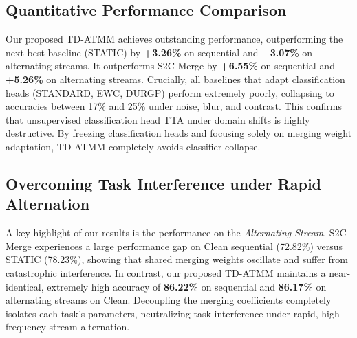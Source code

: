 \documentclass{article}
\theoremstyle{plain}
\theoremstyle{definition}
\theoremstyle{remark}
\begin{document}
\subsection{Quantitative Performance Comparison}
Our proposed TD-ATMM achieves outstanding performance, outperforming the next-best baseline (STATIC) by \textbf{+3.26\%} on sequential and \textbf{+3.07\%} on alternating streams. It outperforms S2C-Merge by \textbf{+6.55\%} on sequential and \textbf{+5.26\%} on alternating streams.
Crucially, all baselines that adapt classification heads (STANDARD, EWC, DURGP) perform extremely poorly, collapsing to accuracies between 17\% and 25\% under noise, blur, and contrast. This confirms that unsupervised classification head TTA under domain shifts is highly destructive. By freezing classification heads and focusing solely on merging weight adaptation, TD-ATMM completely avoids classifier collapse.

\subsection{Overcoming Task Interference under Rapid Alternation}
A key highlight of our results is the performance on the \emph{Alternating Stream}. S2C-Merge experiences a large performance gap on Clean sequential (72.82\%) versus STATIC (78.23\%), showing that shared merging weights oscillate and suffer from catastrophic interference.
In contrast, our proposed TD-ATMM maintains a near-identical, extremely high accuracy of \textbf{86.22\%} on sequential and \textbf{86.17\%} on alternating streams on Clean. Decoupling the merging coefficients completely isolates each task's parameters, neutralizing task interference under rapid, high-frequency stream alternation.
\end{document}
